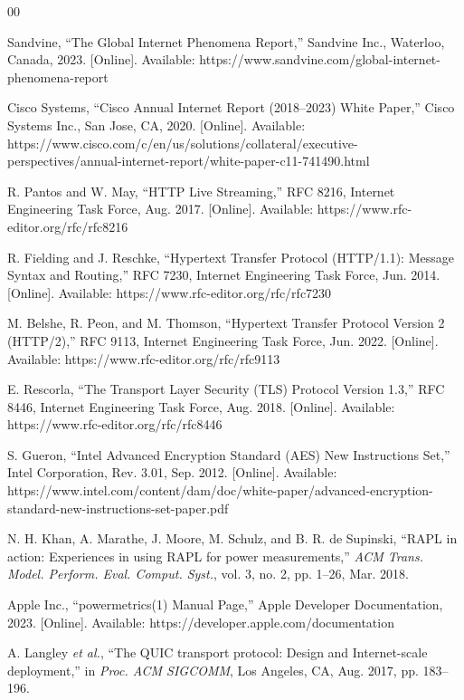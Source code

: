 \documentclass[conference]{IEEEtran}
\begin{document}
\begin{thebibliography}{00}

Sandvine, ``The Global Internet Phenomena Report,'' Sandvine Inc., Waterloo, Canada,
2023. [Online]. Available: https://www.sandvine.com/global-internet-phenomena-report

Cisco Systems, ``Cisco Annual Internet Report (2018--2023) White Paper,'' Cisco Systems
Inc., San Jose, CA, 2020. [Online]. Available:
https://www.cisco.com/c/en/us/solutions/collateral/executive-perspectives/annual-internet-report/white-paper-c11-741490.html

R. Pantos and W. May, ``HTTP Live Streaming,'' RFC 8216, Internet Engineering Task Force,
Aug. 2017. [Online]. Available: https://www.rfc-editor.org/rfc/rfc8216

R. Fielding and J. Reschke, ``Hypertext Transfer Protocol (HTTP/1.1): Message Syntax and
Routing,'' RFC 7230, Internet Engineering Task Force, Jun. 2014. [Online]. Available:
https://www.rfc-editor.org/rfc/rfc7230

M. Belshe, R. Peon, and M. Thomson, ``Hypertext Transfer Protocol Version 2 (HTTP/2),''
RFC 9113, Internet Engineering Task Force, Jun. 2022. [Online]. Available:
https://www.rfc-editor.org/rfc/rfc9113

E. Rescorla, ``The Transport Layer Security (TLS) Protocol Version 1.3,'' RFC 8446,
Internet Engineering Task Force, Aug. 2018. [Online]. Available:
https://www.rfc-editor.org/rfc/rfc8446

S. Gueron, ``Intel Advanced Encryption Standard (AES) New Instructions Set,'' Intel
Corporation, Rev. 3.01, Sep. 2012. [Online]. Available:
https://www.intel.com/content/dam/doc/white-paper/advanced-encryption-standard-new-instructions-set-paper.pdf

N. H. Khan, A. Marathe, J. Moore, M. Schulz, and B. R. de Supinski, ``RAPL in action:
Experiences in using RAPL for power measurements,'' \textit{ACM Trans. Model. Perform.
Eval. Comput. Syst.}, vol. 3, no. 2, pp. 1--26, Mar. 2018.

Apple Inc., ``powermetrics(1) Manual Page,'' Apple Developer Documentation, 2023.
[Online]. Available: https://developer.apple.com/documentation

A. Langley \textit{et al.}, ``The QUIC transport protocol: Design and Internet-scale
deployment,'' in \textit{Proc. ACM SIGCOMM}, Los Angeles, CA, Aug. 2017, pp. 183--196.

\end{thebibliography}
\end{document}
